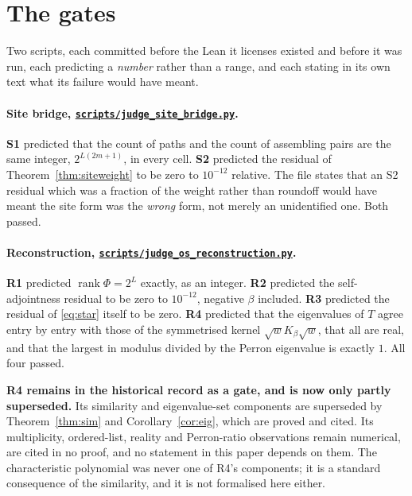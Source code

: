 \documentclass[11pt]{article}
\theoremstyle{definition}
\newcommand{\anchor}{c90dc745ab8cd1ba7ddc02aa16fed3de339bf958}
\newcommand{\repofile}[2]{%
  \href{https://github.com/lluiseriksson/THE-ERIKSSON-PROGRAMME/blob/\anchor/#1}{\nolinkurl{#2}}}
\begin{document}
\section{The gates}\label{sec:gates}

Two scripts, each committed before the Lean it licenses existed and before it
was run, each predicting a \emph{number} rather than a range, and each stating
in its own text what its failure would have meant.

\paragraph{Site bridge, \repofile{scripts/judge\_site\_bridge.py}{scripts/judge\_site\_bridge.py}.}
\textbf{S1} predicted that the count of paths and the count of assembling pairs
are the same integer, $2^{L(2m+1)}$, in every cell.  \textbf{S2} predicted the
residual of Theorem~\ref{thm:siteweight} to be zero to $10^{-12}$ relative.  The
file states that an S2 residual which was a fraction of the weight rather than
roundoff would have meant the site form was the \emph{wrong} form, not merely an
unidentified one.  Both passed.

\paragraph{Reconstruction, \repofile{scripts/judge\_os\_reconstruction.py}{scripts/judge\_os\_reconstruction.py}.}
\textbf{R1} predicted $\operatorname{rank}\Phi=2^L$ exactly, as an integer.
\textbf{R2} predicted the self-adjointness residual to be zero to $10^{-12}$,
negative $\beta$ included.  \textbf{R3} predicted the residual of \eqref{eq:star}
itself to be zero.  \textbf{R4} predicted that the eigenvalues of $T$ agree
entry by entry with those of the symmetrised kernel $\sqrt{w}K_\beta\sqrt{w}$,
that all are real, and that the largest in modulus divided by the Perron
eigenvalue is exactly $1$.  All four passed.

\textbf{R4 remains in the historical record as a gate, and is now only partly
superseded.}  Its similarity and eigenvalue-set components are superseded by
Theorem~\ref{thm:sim} and Corollary~\ref{cor:eig}, which are proved and cited.
Its multiplicity, ordered-list, reality and Perron-ratio observations remain
numerical, are cited in no proof, and no statement in this paper depends on
them.  The characteristic polynomial was never one of R4's components; it is a
standard consequence of the similarity, and it is not formalised here either.
\end{document}
